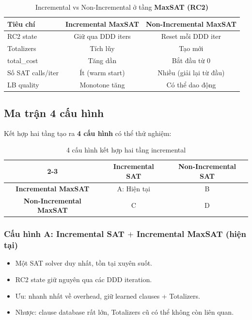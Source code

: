 \documentclass[11pt,a4paper]{article}
\begin{document}
\begin{table}[h]
\centering
\begin{tabular}{lcc}
\toprule
\textbf{Tiêu chí} & \textbf{Incremental MaxSAT} & \textbf{Non-Incremental MaxSAT} \\
\midrule
RC2 state & Giữ qua DDD iters & Reset mỗi DDD iter \\
Totalizers & Tích lũy & Tạo mới \\
total\_cost & Tăng dần & Bắt đầu từ 0 \\
Số SAT calls/iter & Ít (warm start) & Nhiều (giải lại từ đầu) \\
LB quality & Monotone tăng & Có thể dao động \\
\bottomrule
\end{tabular}
\caption{Incremental vs Non-Incremental ở tầng \textbf{MaxSAT (RC2)}}
\end{table}

\subsection{Ma trận 4 cấu hình}

Kết hợp hai tầng tạo ra \textbf{4 cấu hình} có thể thử nghiệm:

\begin{table}[h]
\centering
\begin{tabular}{c|c|c|}
\cline{2-3}
 & \textbf{Incremental SAT} & \textbf{Non-Incremental SAT} \\
\hline
\multicolumn{1}{|c|}{\textbf{Incremental MaxSAT}} & \cellcolor{blue!10} A: Hiện tại & B \\
\hline
\multicolumn{1}{|c|}{\textbf{Non-Incremental MaxSAT}} & C & D \\
\hline
\end{tabular}
\caption{4 cấu hình kết hợp hai tầng incremental}
\end{table}

\subsubsection{Cấu hình A: Incremental SAT $+$ Incremental MaxSAT (hiện tại)}

\begin{itemize}
  \item Một SAT solver duy nhất, tồn tại xuyên suốt.
  \item RC2 state giữ nguyên qua các DDD iteration.
  \item Ưu: nhanh nhất về overhead, giữ learned clauses + Totalizers.
  \item Nhược: clause database rất lớn, Totalizers cũ có thể không còn liên quan.
\end{itemize}
\end{document}
